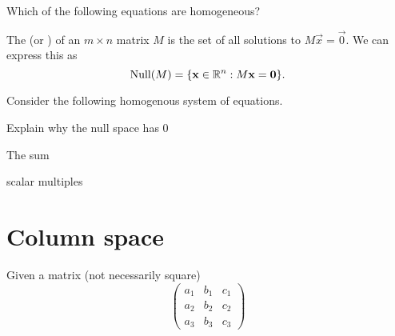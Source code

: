 \documentclass{ximera}
\begin{document}

\begin{question}
  Which of the following equations are homogeneous?
  \begin{selectAll}
  \end{selectAll}
\end{question}



\begin{definition}
  The  (or ) of an $m \times n$ matrix $M$ is
  the set of all solutions to $M\vec{x} = \vec{0}$. We can express
  this as
  \[
  \operatorname{Null}(M) = \{ \mathbf{x}\in\mathbb{R}^n: M\mathbf{x} = \mathbf{0}\}.
  \]
\end{definition}



\begin{example}
  Consider the following homogenous system of equations.

  Explain why the null space has 0

  The sum

  scalar multiples

\end{example}





\section{Column space}

Given a matrix (not necessarily square)
\[
\begin{pmatrix}
  a_1 &  b_1  &  c_1 \\
  a_2 & b_2 & c_2 \\
  a_3 & b_3 & c_3
\end{pmatrix}
\]
\end{document}
